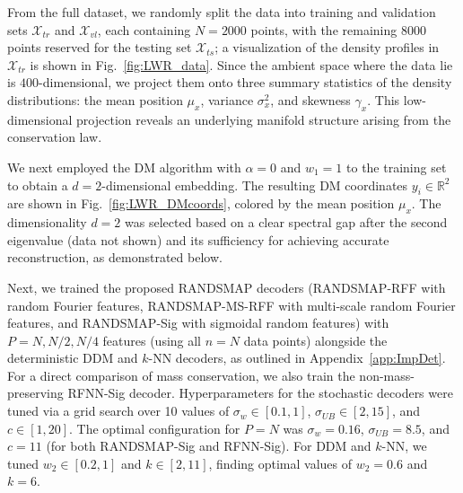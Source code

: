 \documentclass{article}
\begin{document}
From the full dataset, we randomly split the data into training and validation sets $\mathcal{X}_{tr}$ and $\mathcal{X}_{vl}$, each containing $N = 2000$ points, with the remaining $8000$ points reserved for the testing set $\mathcal{X}_{ts}$; a visualization of the density profiles in $\mathcal{X}_{tr}$ is shown in  Fig.~\ref{fig:LWR_data}. Since the ambient space where the data lie is $400$-dimensional, we project them onto three summary statistics of the density distributions: the mean position $\mu_x$, variance $\sigma_x^2$, and skewness $\gamma_x$. This low-dimensional projection reveals an underlying manifold structure arising from the conservation law.

We next employed the DM algorithm with $\alpha=0$ and $w_1=1$ to the training set to obtain a $d=2$-dimensional embedding. The resulting DM coordinates $y_i \in \mathbb{R}^2$ are shown in Fig.~\ref{fig:LWR_DMcoords}, colored by the mean position $\mu_x$. The dimensionality $d=2$ was selected based on a clear spectral gap after the second eigenvalue (data not shown) and its sufficiency for achieving accurate reconstruction, as demonstrated below.

Next, we trained the proposed RANDSMAP decoders (RANDSMAP-RFF with random Fourier features, RANDSMAP-MS-RFF with multi-scale random Fourier features, and RANDSMAP-Sig with sigmoidal random features) with $P = N, N/2, N/4$ features (using all $n=N$ data points) alongside the deterministic DDM and $k$-NN decoders, as outlined in Appendix~\ref{app:ImpDet}. For a direct comparison of mass conservation, we also train the non-mass-preserving RFNN-Sig decoder. Hyperparameters for the stochastic decoders were tuned via a grid search over 10 values of $\sigma_w \in [0.1, 1]$, $\sigma_{UB} \in [2, 15]$, and $c \in [1, 20]$. The optimal configuration for $P=N$ was $\sigma_w = 0.16$, $\sigma_{UB} = 8.5$, and $c = 11$ (for both RANDSMAP-Sig and RFNN-Sig). For DDM and $k$-NN, we tuned $w_2 \in [0.2, 1]$ and $k \in [2, 11]$, finding optimal values of $w_2 = 0.6$ and $k = 6$.
\end{document}
